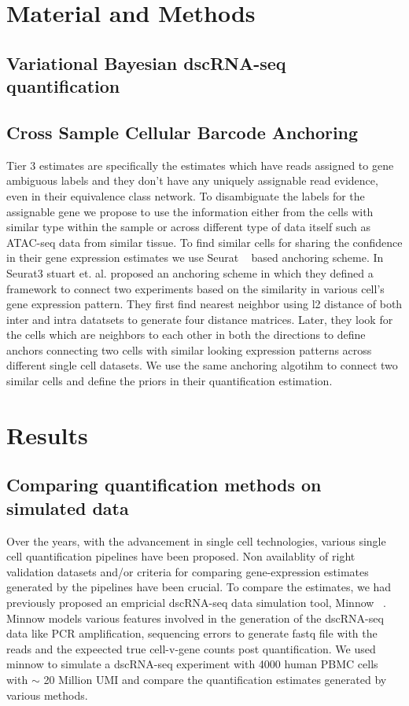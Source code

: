 \section{Material and Methods}
\label{sec:alv2_methods}

\subsection{Variational Bayesian dscRNA-seq quantification}


\subsection{Cross Sample Cellular Barcode Anchoring}
Tier 3 estimates are specifically the estimates which have reads assigned to gene ambiguous 
labels and they don't have any uniquely assignable read evidence, even in their equivalence 
class network. To disambiguate the labels for the assignable gene we propose to use the 
information either from the cells with similar type within the sample or across different 
type of data itself such as ATAC-seq data from similar tissue. To find similar cells for sharing 
the confidence in their gene expression estimates we use Seurat ~\citep{seurat3} based anchoring 
scheme. In Seurat3 stuart et. al. proposed an anchoring scheme in which they defined a framework 
to connect two experiments based on the similarity in various cell's gene expression pattern. 
They first find nearest neighbor using l2 distance of both inter and intra datatsets to generate 
four distance matrices. Later, they look for the cells which are neighbors to each other in both 
the directions to define anchors connecting two cells with similar looking expression patterns 
across different single cell datasets. We use the same anchoring algotihm to connect two similar 
cells and define the priors in their quantification estimation.

\section{Results}
\subsection{Comparing quantification methods on simulated data}
\label{subsec:alv2_sims}
Over the years, with the advancement in single cell technologies, various single cell quantification 
pipelines have been proposed. Non availablity of right validation datasets and/or criteria for comparing 
gene-expression estimates generated by the pipelines have been crucial. To compare the estimates, we 
had previously proposed an empricial dscRNA-seq data simulation tool, Minnow ~\citep{sarkar2019minnow}. 
Minnow models various features involved in the generation of the dscRNA-seq data like PCR amplification, 
sequencing errors to generate fastq file with the reads and the expeected true cell-v-gene counts post 
quantification. We used minnow to simulate a dscRNA-seq experiment with 4000 human PBMC cells with $\sim$ 
20 Million UMI and compare the quantification estimates generated by various methods.


